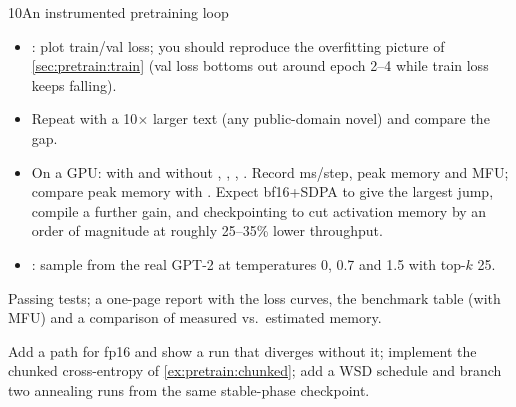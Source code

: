 \begin{labbox}{10}{An instrumented pretraining loop}
\begin{itemize}
\item {}: plot train/val loss;
  you should reproduce the overfitting picture of \cref{sec:pretrain:train} (val loss bottoms
  out around epoch 2--4 while train loss keeps falling).
\item Repeat with a 10$\times$ larger text (any public-domain novel) and compare the gap.
\item On a GPU:  with and without
  , , , . Record ms/step, peak
  memory and MFU; compare peak memory with . Expect bf16+SDPA
  to give the largest jump, compile a further gain, and checkpointing to cut activation memory
  by an order of magnitude at roughly 25--35\% lower throughput.
\item {}: sample from the real GPT-2 at temperatures
  0, 0.7 and 1.5 with top-$k$ 25.
\end{itemize}

Passing tests; a one-page report with the loss curves, the benchmark table (with MFU) and a
comparison of measured vs.\ estimated memory.

Add a  path for fp16 and show a run that diverges without it; implement the
chunked cross-entropy of \cref{ex:pretrain:chunked}; add a WSD schedule and
branch two annealing runs from the same stable-phase checkpoint.
\end{labbox}
